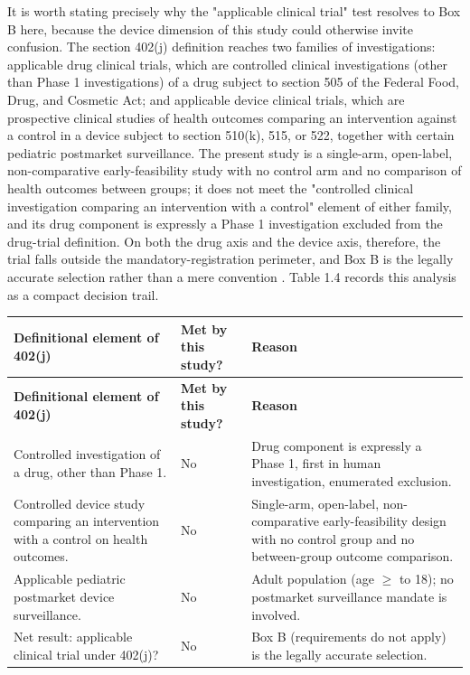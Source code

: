 It is worth stating precisely why the "applicable clinical trial" test
resolves to Box B here, because the device dimension of this study could
otherwise invite confusion. The section 402(j) definition reaches two
families of investigations: applicable drug clinical trials, which are
controlled clinical investigations (other than Phase 1 investigations) of
a drug subject to section 505 of the Federal Food, Drug, and Cosmetic Act;
and applicable device clinical trials, which are prospective clinical
studies of health outcomes comparing an intervention against a control in
a device subject to section 510(k), 515, or 522, together with certain
pediatric postmarket surveillance. The present study is a single-arm,
open-label, non-comparative early-feasibility study with no control arm
and no comparison of health outcomes between groups; it does not meet the
"controlled clinical investigation comparing an intervention with a
control" element of either family, and its drug component is expressly a
Phase 1 investigation excluded from the drug-trial definition. On both the
drug axis and the device axis, therefore, the trial falls outside the
mandatory-registration perimeter, and Box B is the legally accurate
selection rather than a mere convention \cite{phase1guidance,
clintrustpai}. Table 1.4 records this analysis as a compact decision
trail.

\begin{center}
\begin{xltabular}{\textwidth}{>{\raggedright\arraybackslash}p{5.5cm} >{\raggedright\arraybackslash}p{2cm} Y}
\toprule
\textbf{Definitional element of 402(j)} & \textbf{Met by this study?} & \textbf{Reason} \\
\midrule
\endfirsthead
\toprule
\textbf{Definitional element of 402(j)} & \textbf{Met by this study?} & \textbf{Reason} \\
\midrule
\endhead
\bottomrule
\endfoot
Controlled investigation of a drug, other than Phase 1. & No & Drug component is expressly a Phase 1, first in human investigation, enumerated exclusion. \\
Controlled device study comparing an intervention with a control on health outcomes. & No & Single-arm, open-label, non-comparative early-feasibility design with no control group and no between-group outcome comparison. \\
Applicable pediatric postmarket device surveillance. & No & Adult population (age $\geq$ to 18); no postmarket surveillance mandate is involved. \\
Net result: applicable clinical trial under 402(j)? & No & Box B (requirements do not apply) is the legally accurate selection. \\
\bottomrule
\end{xltabular}
\end{center}
\vspace{-1.75cm}

